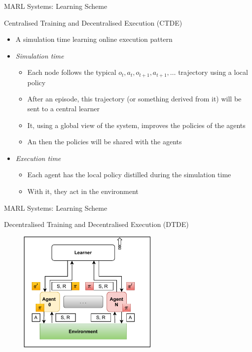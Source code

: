 \documentclass[presentation]{beamer}\mode<presentation>{\usetheme{AMSBolognaFC}}
\begin{document}
\begin{frame}{MARL Systems: Learning Scheme}
	
	\begin{exampleblock}{Centralised Training and Decentralised Execution (CTDE)}
		\begin{itemize}
			\item A simulation time learning online execution pattern
			\item \emph{Simulation time}
			\begin{itemize}
				\item Each node follows the typical $o_t, a_t, o_{t+1}, a_{t+1},\dots $ trajectory using a local policy
				\item After an episode, this trajectory (or something derived from it) will be sent to a central learner
				\item It, using a global view of the system, improves the policies of the agents 
				\item An then the policies will be shared with the agents
			\end{itemize} 
			\item \emph{Execution time}
				\begin{itemize}
					\item Each agent has the local policy distilled during the simulation time
					\item With it, they act in the environment
				\end{itemize}
		\end{itemize}
	\end{exampleblock}
\end{frame}


\begin{frame}{MARL Systems: Learning Scheme}
	\begin{exampleblock}{Decentralised Training and Decentralised Execution (DTDE)}
		\begin{figure}
			\includegraphics[height=6cm]{img/learning-scheme-ctde.pdf}
		\end{figure}
	\end{exampleblock}
\end{frame}
\end{document}
